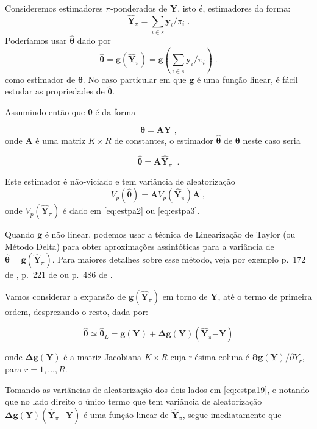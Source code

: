 \documentclass[]{book}
\numberwithin{example}{chapter}
\numberwithin{remark}{chapter}
\numberwithin{definition}{chapter}
\begin{document}
Consideremos estimadores \(\pi\)-ponderados de \(\mathbf{Y}\), isto é,
estimadores da forma: \[
\widehat{\mathbf{Y}}_{\pi }=\sum_{i\in s}\mathbf{y}_{i}/\pi _{i}\;. 
\] Poderíamos usar \(\mathbf{\hat{\theta}}\) dado por \[
\mathbf{\hat{\theta}}=\mathbf{g}\left( \widehat{\mathbf{Y}}_{\pi }\right) =\mathbf{g}(\sum_{i\in s}\mathbf{y}_{i}/\pi _{i})\;. 
\] como estimador de \(\mathbf{\theta}\). No caso particular em que
\(\mathbf{g}\) é uma função linear, é fácil estudar as propriedades de
\(\mathbf{\hat{\theta}}\).

Assumindo então que \(\mathbf{\theta}\) é da forma

\[
\mathbf{\theta }=\mathbf{AY}\mbox{ ,} 
\] onde \(\mathbf{A}\) é uma matriz \(K\times R\) de constantes, o
estimador \(\mathbf{\hat{\theta}}\) de \(\mathbf{\theta }\) neste caso
seria

\[
\mathbf{\hat{\theta}}=\mathbf{A\hat{Y}}_{\pi }\;\;. 
\]

Este estimador é não-viciado e tem variância de aleatorização \[
V_{p}\left( \mathbf{\hat{\theta}}\right) =\mathbf{A}V_{p}\left( \mathbf{\hat{Y}}_{\pi }\right) \mathbf{A}^{^{\prime }}\mathbf{,} 
\] onde \(V_{p}\left( \mathbf{\hat{Y}}_{\pi }\right)\) é dado em
\eqref{eq:estpa2} ou \eqref{eq:estpa3}.

Quando \(\mathbf{g}\) é não linear, podemos usar a técnica de
Linearização de Taylor (ou Método Delta) para obter aproximações
assintóticas para a variância de
\(\mathbf{\hat{\theta}}=\mathbf{g}\left( \widehat{\mathbf{Y}}_{\pi }\right)\).
Para maiores detalhes sobre esse método, veja por exemplo p.~172 de
\citep{SSW92}, p.~221 de \citep{W85} ou p.~486 de \citep{Bishop}.

Vamos considerar a expansão de
\(\mathbf{g}\left( \mathbf{\hat{Y}}_{\pi }\right)\) em torno de
\(\mathbf{Y}\), até o termo de primeira ordem, desprezando o resto, dada
por:

\begin{equation}
\mathbf{\hat{\theta}\simeq \hat{\theta}}_{L}=\mathbf{g(Y)+\Delta g(Y)}\left( 
\mathbf{\hat{Y}}_{\pi }\mathbf{-Y}\right)  \label{eq:estpa19}
\end{equation}

onde \(\mathbf{\Delta g(Y)}\) é a matriz Jacobiana \(K\times R\) cuja
r-ésima coluna é \(\mathbf{\partial g(Y)/}\partial Y_{r}\),\\
para \(r=1,\ldots,R\).

Tomando as variâncias de aleatorização dos dois lados em
\eqref{eq:estpa19}, e notando que no lado direito o único termo que tem
variância de aleatorização
\(\mathbf{\Delta g(Y)}\left( \mathbf{\hat{Y}}_{\pi }\mathbf{-Y}\right)\)
é uma função linear de \(\mathbf{\hat{Y}}_{\pi}\), segue imediatamente
que
\end{document}

